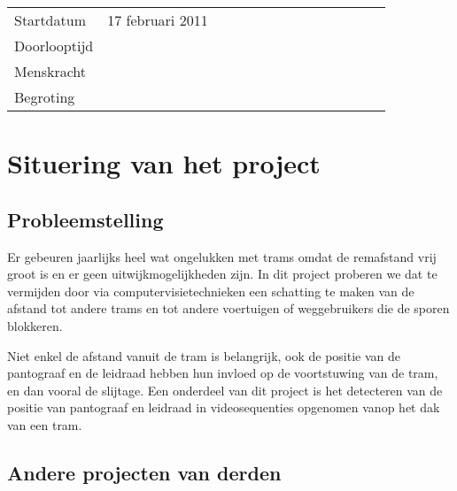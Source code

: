 \documentclass[]{book}
\begin{document}
\begin{table}[h]
		\begin{tabular}{*{14}{l}}
		Startdatum & 17 februari 2011 \\
		Doorlooptijd & \\
		Menskracht & \\	
		Begroting & \\
		\end{tabular}
\end{table}

\section{Situering van het project}\label{sec:Situering}

\subsection{Probleemstelling}\label{sec:Probleemstelling}

%

Er gebeuren jaarlijks heel wat ongelukken met trams omdat de remafstand vrij groot is en er geen uitwijkmogelijkheden zijn. In dit project proberen we dat te vermijden door via computervisietechnieken een schatting te maken van de afstand tot andere trams en tot andere voertuigen of weggebruikers die de sporen blokkeren. 

Niet enkel de afstand vanuit de tram is belangrijk, ook de positie van de pantograaf en de leidraad hebben hun invloed op de voortstuwing van de tram, en dan vooral de slijtage. Een onderdeel van dit project is het detecteren van de positie van pantograaf en leidraad in videosequenties opgenomen vanop het dak van een tram.

\subsection{Andere projecten van derden}\label{sec:Andere}

\end{document}
